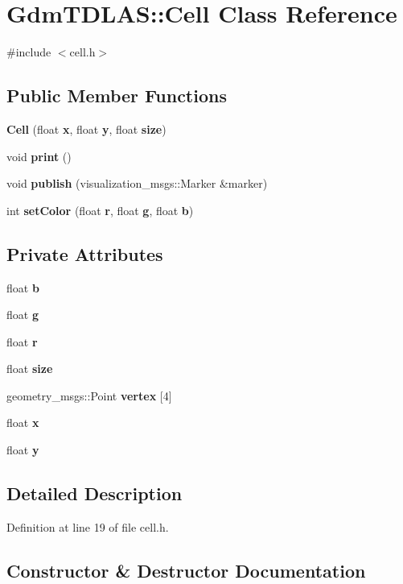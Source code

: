 \section{GdmTDLAS::Cell Class Reference}
\label{classGdmTDLAS_1_1Cell}


{\ttfamily \#include $<$cell.h$>$}

\subsection*{Public Member Functions}
\begin{DoxyCompactItemize}
\item 
{\bf Cell} (float {\bf x}, float {\bf y}, float {\bf size})
\item 
void {\bf print} ()
\item 
void {\bf publish} (visualization\_\-msgs::Marker \&marker)
\item 
int {\bf setColor} (float {\bf r}, float {\bf g}, float {\bf b})
\end{DoxyCompactItemize}
\subsection*{Private Attributes}
\begin{DoxyCompactItemize}
\item 
float {\bf b}
\item 
float {\bf g}
\item 
float {\bf r}
\item 
float {\bf size}
\item 
geometry\_\-msgs::Point {\bf vertex} [4]
\item 
float {\bf x}
\item 
float {\bf y}
\end{DoxyCompactItemize}


\subsection{Detailed Description}


Definition at line 19 of file cell.h.



\subsection{Constructor \& Destructor Documentation}
